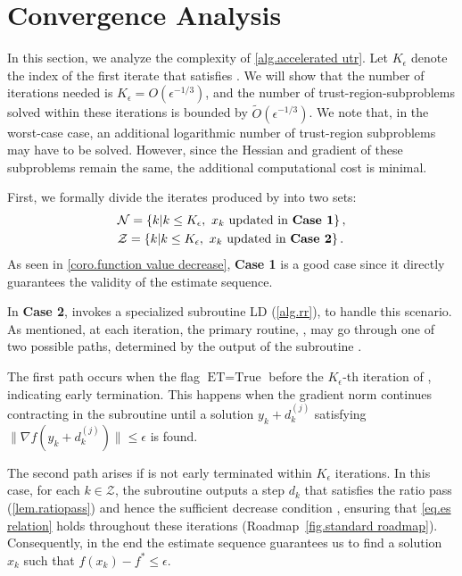 \documentclass{article}
\theoremstyle{plain}
\theoremstyle{definition}
\theoremstyle{remark}
\begin{document}
\section{Convergence Analysis}\label{sec.convergence}
In this section, we analyze the complexity of \cref{alg.accelerated utr}. Let $K_\epsilon$ denote the index of the first iterate that satisfies . We will show that the number of iterations needed is $K_\epsilon = O(\epsilon^{-1/3})$, and the number of trust-region-subproblems solved within these iterations is bounded by $\tilde{O}(\epsilon^{-1/3})$. We note that, in the worst-case case, an additional logarithmic number of trust-region subproblems may have to be solved. However, since the Hessian and gradient of these subproblems remain the same, the additional computational cost is minimal.


First, we formally divide the iterates produced by  into two sets:
\begin{equation}
    \label{eq.outer index catagory}
    \begin{aligned}
         & \mathcal{N} = \left \{ k | k\leq K_\epsilon,\ x_k \text{\ updated in \textbf{Case 1}}\right\}, \\
         & \mathcal{Z} = \left \{k |k\leq K_\epsilon,\ x_k \text{\ updated in \textbf{Case 2}}\right\}.
    \end{aligned}
\end{equation}
As seen in \cref{coro.function value decrease}, \textbf{Case 1} is a good case since it directly guarantees the validity of the estimate sequence.

In \textbf{Case 2},  invokes a specialized subroutine LD (\cref{alg.rr}), to handle this scenario. As mentioned, at each iteration, the primary routine, , may go through one of two possible paths, determined by the output of the subroutine .

The first path occurs when the flag $\textrm{ET} = \text{True}$ before the $K_\epsilon$-th iteration of , indicating early termination. This happens when the gradient norm continues contracting in the subroutine until a solution $y_k + d_k^{(j)}$ satisfying $\|\nabla f(y_k + d_k^{(j)})\| \leq \epsilon$ is found.

The second path arises if  is not early terminated within $K_\epsilon$ iterations. In this case, for each $k \in \mathcal{Z}$, the subroutine outputs a step $d_k$ that satisfies the ratio pass (\cref{lem.ratiopass}) and hence the sufficient decrease condition , ensuring that \eqref{eq.es relation} holds throughout these iterations (Roadmap~\ref{fig.standard roadmap}). Consequently, in the end the estimate sequence guarantees us to find a solution $x_k$ such that $f(x_k) - f^* \leq \epsilon$.
\end{document}
